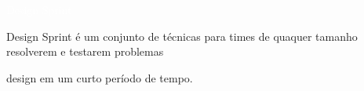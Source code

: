 \newcommand{\textBox}[1]{
\hspace*{7pt}
\begin{tabular}{  p{\dimexpr 0.97\linewidth-2\tabcolsep} }
  	{\normalsize #1}
\end{tabular}
\vspace*{10pt}
}

\LARGE
\noindent\colorbox{materialYellow}
{\parbox[c][25pt][c]{\textwidth}{\hspace{15pt}\textcolor{white}{Design Sprint}}} %

\large
\vspace*{10pt}

\textcolor{materialYellow}{Design Sprint} é um conjunto de técnicas para times
de quaquer tamanho resolverem e testarem problemas

\vspace*{10pt}

design em um curto período de tempo.

\vspace*{10pt}
